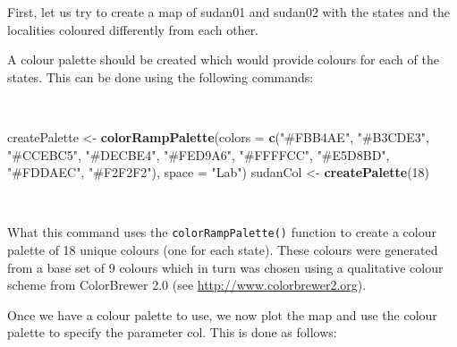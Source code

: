 \documentclass[12pt,a4paper,a4paper]{book}
\newenvironment{Shaded}{\begin{snugshade}}{\end{snugshade}}
\newcommand{\KeywordTok}[1]{\textcolor[rgb]{0.13,0.29,0.53}{\textbf{#1}}}
\newcommand{\DataTypeTok}[1]{\textcolor[rgb]{0.13,0.29,0.53}{#1}}
\newcommand{\DecValTok}[1]{\textcolor[rgb]{0.00,0.00,0.81}{#1}}
\newcommand{\FloatTok}[1]{\textcolor[rgb]{0.00,0.00,0.81}{#1}}
\newcommand{\StringTok}[1]{\textcolor[rgb]{0.31,0.60,0.02}{#1}}
\newcommand{\OtherTok}[1]{\textcolor[rgb]{0.56,0.35,0.01}{#1}}
\newcommand{\OperatorTok}[1]{\textcolor[rgb]{0.81,0.36,0.00}{\textbf{#1}}}
\newcommand{\NormalTok}[1]{#1}
\theoremstyle{definition}
\theoremstyle{definition}
\theoremstyle{definition}
\theoremstyle{remark}
\begin{document}
First, let us try to create a map of sudan01 and sudan02 with the states
and the localities coloured differently from each other.

A colour palette should be created which would provide colours for each
of the states. This can be done using the following commands:

~

\begin{Shaded}
\begin{Highlighting}[]
\NormalTok{createPalette <-}\StringTok{ }\KeywordTok{colorRampPalette}\NormalTok{(}\DataTypeTok{colors =} \KeywordTok{c}\NormalTok{(}\StringTok{"#FBB4AE"}\NormalTok{, }\StringTok{"#B3CDE3"}\NormalTok{, }\StringTok{"#CCEBC5"}\NormalTok{, }
                                             \StringTok{"#DECBE4"}\NormalTok{, }\StringTok{"#FED9A6"}\NormalTok{, }\StringTok{"#FFFFCC"}\NormalTok{, }
                                             \StringTok{"#E5D8BD"}\NormalTok{, }\StringTok{"#FDDAEC"}\NormalTok{, }\StringTok{"#F2F2F2"}\NormalTok{), }
                                  \DataTypeTok{space =} \StringTok{"Lab"}\NormalTok{)}
\NormalTok{sudanCol <-}\StringTok{ }\KeywordTok{createPalette}\NormalTok{(}\DecValTok{18}\NormalTok{)}
\end{Highlighting}
\end{Shaded}

~

What this command uses the \texttt{colorRampPalette()} function to
create a colour palette of 18 unique colours (one for each state). These
colours were generated from a base set of 9 colours which in turn was
chosen using a qualitative colour scheme from ColorBrewer 2.0 (see
\url{http://www.colorbrewer2.org}).

\newpage

Once we have a colour palette to use, we now plot the map and use the
colour palette to specify the parameter col. This is done as follows:

~

\begin{Shaded}
\end{Shaded}
\end{document}
